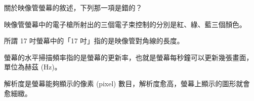 \ifx\ntpcNinetyThree\undefined[93學年基北區] \fi
關於映像管螢幕的敘述，下列那一項是錯的？
  \begin{optionlist}
  \item 映像管螢幕中的電子槍所射出的三個電子束控制的分別是紅、綠、藍三個顏色。
  \item 所謂 17 吋螢幕中的「17 吋」指的是映像管對角線的長度。
  \item 螢幕的水平掃描頻率指的是螢幕的更新率，也就是螢幕每秒鐘可以更新幾張畫面，單位為赫茲 (Hz)。\label{ntpc-93-a1}
  \item 解析度是螢幕能夠顯示的像素 (pixel) 數目，解析度愈高，螢幕上顯示的圖形就會愈細緻。
  \end{optionlist}